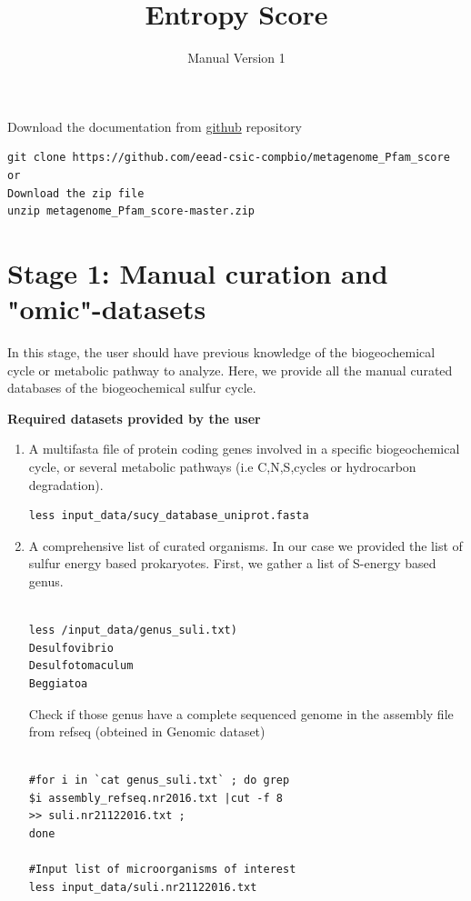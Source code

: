 \documentclass[a4paper,11pt]{report}
\title{\LARGE\textbf{ Entropy Score}}          %
\author{\large Manual Version 1}            %
\begin{document}
\maketitle
\tableofcontents
\newpage

Download the documentation from   \href{https://github.com/eead-csic-compbio/metagenome_Pfam_score}{github} repository

\begin{verbatim}
git clone https://github.com/eead-csic-compbio/metagenome_Pfam_score
or 
Download the zip file 
unzip metagenome_Pfam_score-master.zip

\end{verbatim}

\section{Stage 1: Manual curation and "omic"-datasets}

\label{stage1}
In this stage, the user should have previous knowledge of the biogeochemical cycle or metabolic pathway to analyze. Here,  we provide  all the manual curated databases of the biogeochemical sulfur cycle.  


\textbf{Required datasets provided by the user }
 
 \begin{enumerate}
 \item A multifasta file of protein coding genes involved in a specific biogeochemical cycle, or several metabolic pathways (i.e C,N,S,cycles or hydrocarbon degradation). 

\begin{verbatim}
less input_data/sucy_database_uniprot.fasta
\end{verbatim}

\item A comprehensive list of curated organisms. In our case we provided the list of sulfur energy based prokaryotes. 
First, we gather a list of S-energy based genus.   
\begin{verbatim}

less /input_data/genus_suli.txt)
Desulfovibrio 
Desulfotomaculum
Beggiatoa 
\end{verbatim}
Check if those genus have a complete sequenced genome in the 
assembly file from refseq (obteined in Genomic dataset) 
\begin{verbatim}

#for i in `cat genus_suli.txt` ; do grep 
$i assembly_refseq.nr2016.txt |cut -f 8  
>> suli.nr21122016.txt ; 
done

#Input list of microorganisms of interest
less input_data/suli.nr21122016.txt
\end{verbatim}
\end{enumerate}
\end{document}
